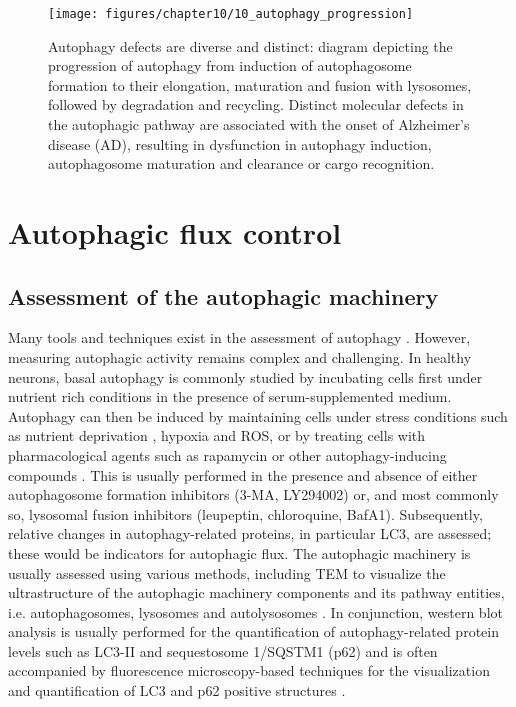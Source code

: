 \begin{figure}[!htbp]
  \texttt{[image: figures/chapter10/10\_autophagy\_progression]}
  \caption[Diverse and distinct autophagy defects]{Autophagy defects are diverse and distinct: diagram depicting the progression of autophagy from induction of autophagosome formation to their elongation, maturation and fusion with lysosomes, followed by degradation and recycling. Distinct molecular defects in the autophagic pathway are associated with the onset of Alzheimer’s disease (AD), resulting in dysfunction in autophagy induction, autophagosome maturation and clearance or cargo recognition.}
  \label{fig:10_autophagy_progression}
\end{figure}

\section{Autophagic flux control}
\subsection{Assessment of the autophagic machinery}
Many tools and techniques exist in the assessment of autophagy \citep{klionsky2016}. However, measuring autophagic activity remains complex and challenging. In healthy neurons, basal autophagy is commonly studied by incubating cells first under nutrient rich conditions in the presence of serum-supplemented medium. Autophagy can then be induced by maintaining cells under stress conditions such as nutrient deprivation \citep{Alirezaei2010}, hypoxia and ROS, or by treating cells with pharmacological agents such as rapamycin or other autophagy-inducing compounds \citep{Boland2008,Rose2010}. This is usually performed in the presence and absence of either autophagosome formation inhibitors (3-MA, LY294002) or, and most commonly so, lysosomal fusion inhibitors (leupeptin, chloroquine, BafA1). Subsequently, relative changes in autophagy-related proteins, in particular LC3, are assessed; these would be indicators for autophagic flux. The autophagic machinery is usually assessed using various methods, including TEM to visualize the ultrastructure of the autophagic machinery components and its pathway entities, i.e. autophagosomes, lysosomes and autolysosomes \citep{klionsky2016}. In conjunction, western blot analysis is usually performed for the quantification of autophagy-related protein levels such as LC3-II and sequestosome 1/SQSTM1 (p62) and is often accompanied by fluorescence microscopy-based techniques for the visualization and quantification of LC3 and p62 positive structures \citep{klionsky2016,Klionsky2012,Mizushima2007,Swanlund2010}.

